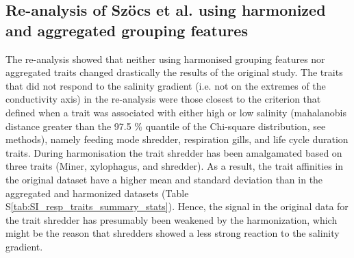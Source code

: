 \documentclass{article}
\begin{document}




\subsection*{Re-analysis of Szöcs et al. using harmonized and aggregated grouping features}

The re-analysis showed that neither using harmonised grouping features nor aggregated traits changed drastically the results of the original study. The traits that did not respond to the salinity gradient (i.e. not on the extremes of the conductivity axis) in the re-analysis were those closest to the criterion that defined when a trait was associated with either high or low salinity (mahalanobis distance greater than the 97.5 \% quantile of the Chi-square distribution, see methods), namely feeding mode shredder, respiration gills, and life cycle duration traits. During harmonisation the trait shredder has been amalgamated based on three traits (Miner, xylophagus, and shredder). As a result, the trait affinities in the original dataset have a higher mean and standard deviation than in the aggregated and harmonized datasets (Table S\ref{tab:SI_resp_traits_summary_stats}). Hence, the signal in the original data for the trait shredder has presumably been weakened by the harmonization, which might be the reason that shredders showed a less strong reaction to the salinity gradient. 
\end{document}
